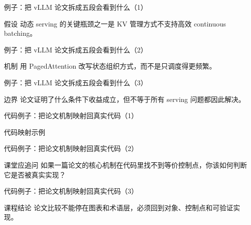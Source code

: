\begin{frame}{例子：把 vLLM 论文拆成五段会看到什么（1）}
\begin{block}{假设}
    动态 serving 的关键瓶颈之一是 KV 管理方式不支持高效 continuous batching。
  \end{block}
\end{frame}

\begin{frame}{例子：把 vLLM 论文拆成五段会看到什么（2）}
\begin{block}{机制}
    用 PagedAttention 改写状态组织方式，而不是只调度得更频繁。
  \end{block}
\end{frame}

\begin{frame}{例子：把 vLLM 论文拆成五段会看到什么（3）}
\begin{block}{边界}
    论文证明了什么条件下收益成立，但不等于所有 serving 问题都因此解决。
  \end{block}
\end{frame}

\begin{frame}{代码例子：把论文机制映射回真实代码（1）}
\begin{block}{代码映射示例}
    {\ttfamily\small
    \par
    \par
    \par
    }
  \end{block}
\end{frame}

\begin{frame}{代码例子：把论文机制映射回真实代码（2）}
\begin{block}{课堂应追问}
    如果一篇论文的核心机制在代码里找不到等价控制点，你该如何判断它是否被真实实现？
  \end{block}
\end{frame}

\begin{frame}{代码例子：把论文机制映射回真实代码（3）}
\begin{block}{课程结论}
    论文比较不能停在图表和术语层，必须回到对象、控制点和可验证实现。
  \end{block}
\end{frame}

